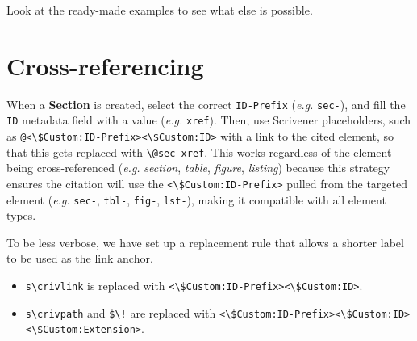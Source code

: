 \documentclass[
  10pt,
  oneside,
  cleardoublepage=empty,
  numbers=noenddot,
  titlepage,
  toclink=all,
  toc=bibliography,
  headinclude,
  footinclude]{scrbook}
\providecommand{\tightlist}{%
  \setlength{\itemsep}{0pt}\setlength{\parskip}{0pt}}\usepackage{longtable,booktabs,array}
\theoremstyle{plain}
\theoremstyle{plain}
\theoremstyle{definition}
\theoremstyle{definition}
\theoremstyle{plain}
\theoremstyle{plain}
\theoremstyle{definition}
\theoremstyle{plain}
\theoremstyle{remark}
\begin{document}
Look at the ready-made examples to see what else is possible.

\section{Cross-referencing}\label{cross-referencing}

When a \textbf{Section} is created, select the correct
\texttt{ID-Prefix} (\emph{e.g.} \texttt{sec-}), and fill the \texttt{ID}
metadata field with a value (\emph{e.g.} \texttt{xref}). Then, use
Scrivener placeholders, such as
\texttt{@\textless{}\textbackslash{}\$Custom:ID-Prefix\textgreater{}\textless{}\textbackslash{}\$Custom:ID\textgreater{}}
with a link to the cited element, so that this gets replaced with
\texttt{\textbackslash{}@sec-xref}. This works regardless of the element
being cross-referenced (\emph{e.g.} \emph{section}, \emph{table},
\emph{figure}, \emph{listing}) because this strategy ensures the
citation will use the
\texttt{\textless{}\textbackslash{}\$Custom:ID-Prefix\textgreater{}}
pulled from the targeted element (\emph{e.g.} \texttt{sec-},
\texttt{tbl-}, \texttt{fig-}, \texttt{lst-}), making it compatible with
all element types.

\begin{tcolorbox}[enhanced jigsaw, bottomrule=.15mm, bottomtitle=1mm, rightrule=.15mm, opacityback=0, coltitle=black, colback=white, left=2mm, arc=.35mm, colbacktitle=quarto-callout-warning-color!10!white, breakable, toptitle=1mm, colframe=quarto-callout-warning-color-frame, toprule=.15mm, titlerule=0mm, title=\textcolor{quarto-callout-warning-color}{\faExclamationTriangle}\hspace{0.5em}{Link anchor}, leftrule=.75mm, opacitybacktitle=0.6]

To be less verbose, we have set up a replacement rule that allows a
shorter label to be used as the link anchor.

\begin{itemize}
\tightlist
\item
  \texttt{s\textbackslash{}crivlink} is replaced with
  \texttt{\textless{}\textbackslash{}\$Custom:ID-Prefix\textgreater{}\textless{}\textbackslash{}\$Custom:ID\textgreater{}}.
\item
  \texttt{s\textbackslash{}crivpath} and \texttt{\$\textbackslash{}!}
  are replaced with
  \texttt{\textless{}\textbackslash{}\$Custom:ID-Prefix\textgreater{}\textless{}\textbackslash{}\$Custom:ID\textgreater{}\textless{}\textbackslash{}\$Custom:Extension\textgreater{}}.
\end{itemize}

\end{tcolorbox}
\end{document}
